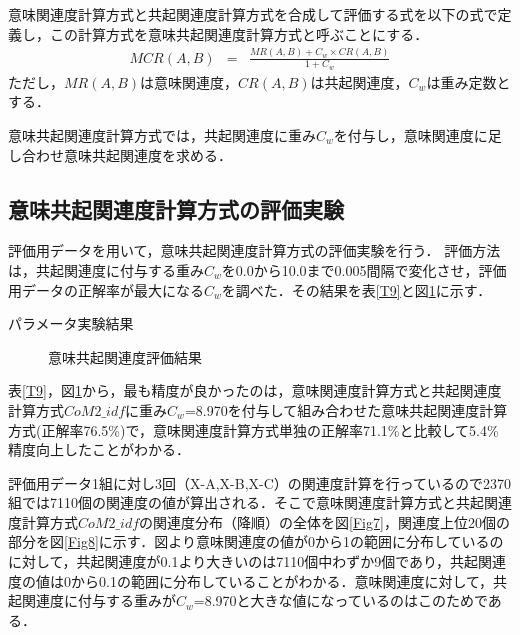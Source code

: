 意味関連度計算方式と共起関連度計算方式を合成して評価する式を以下の式で定義し，この計算方式を意味共起関連度計算方式と呼ぶことにする．
\begin{eqnarray}
MCR(A,B) &=& \frac{MR(A,B)+C_w \times CR(A,B)}{1+C_w}
\end{eqnarray}
ただし，$MR(A,B)$は意味関連度，$CR(A,B)$は共起関連度，$C_w$は重み定数とする．

意味共起関連度計算方式では，共起関連度に重み$C_w$を付与し，意味関連度に足し合わせ意味共起関連度を求める．

\subsection{意味共起関連度計算方式の評価実験}

評価用データを用いて，意味共起関連度計算方式の評価実験を行う．
評価方法は，共起関連度に付与する重み$C_w$を0.0から10.0まで0.005間隔で変化させ，評価用データの正解率が最大になる$C_w$を調べた．その結果を表\ref{T9}と図\ref{Fig6}に示す．

\begin{table}[tb]
\caption[]{パラメータ実験結果}
\label{T9}
\begin{center}
\end{center}
\end{table}

\begin{figure}[tb]
\begin{center}
\end{center}
\caption{意味共起関連度評価結果}
\label{Fig6}
\end{figure}

表\ref{T9}，図\ref{Fig6}から，最も精度が良かったのは，意味関連度計算方式と共起関連度計算方式$CoM2\_idf$に重み$C_w$=8.970を付与して組み合わせた意味共起関連度計算方式(正解率76.5\%)で，意味関連度計算方式単独の正解率71.1\%と比較して5.4\%精度向上したことがわかる．

評価用データ1組に対し3回（X-A,X-B,X-C）の関連度計算を行っているので2370組では7110個の関連度の値が算出される．そこで意味関連度計算方式と共起関連度計算方式$CoM2\_idf$の関連度分布（降順）の全体を図\ref{Fig7}，関連度上位20個の部分を図\ref{Fig8}に示す．図より意味関連度の値が0から1の範囲に分布しているのに対して，共起関連度が0.1より大きいのは7110個中わずか9個であり，共起関連度の値は0から0.1の範囲に分布していることがわかる．意味関連度に対して，共起関連度に付与する重みが$C_w$=8.970と大きな値になっているのはこのためである．

